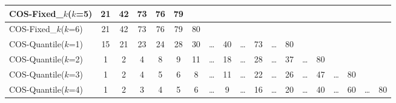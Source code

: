 \begin{table*}[ht]
{\begin{tabular}{|l|c|c|c|c|c|c|c|c|c|c|c|c|c|c|c|c|c|c|}
      COS-Fixed\_$k$($k$=5) & 21 & 42 & 73 & 76 & 79 & ~ & ~ & ~ & ~ & ~ & ~ & ~ & ~ & ~ & ~ & ~ & ~ & ~ \\ \hline
      COS-Fixed\_$k$($k$=6) & 21 & 42 & 73 & 76 & 79 & 80 & ~ & ~ & ~ & ~ & ~ & ~ & ~ & ~ & ~ & ~ & ~ & ~ \\ \hline
      COS-Quantile($k$=1) & 15 & 21 & 23 & 24 & 28 & 30 & \dots & 40 & \dots & 73 & \dots & 80 & ~ & ~ & ~ & ~ & ~ & ~ \\ \hline
      COS-Quantile($k$=2) & 1 & 2 & 4 & 8 & 9 & 11 & \dots & 18 & \dots & 28 & \dots & 37 & \dots & 80 & ~ & ~ & ~ & ~ \\ \hline
      COS-Quantile($k$=3) & 1 & 2 & 4 & 5 & 6 & 8 & \dots & 11 & \dots & 22 & \dots & 26 & \dots & 47 & \dots & 80 & ~ & ~ \\ \hline
      COS-Quantile($k$=4) & 1 & 2 & 3 & 4 & 5 & 6 & \dots & 9 & \dots & 16 & \dots & 20 & \dots & 40 & \dots & 60 & \dots & 80 \\ \hline
    \end{tabular}
  }
\end{table*}
